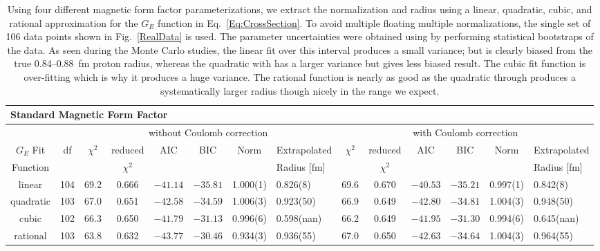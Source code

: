 \documentclass[10pt,aps,prc,twocolumn]{revtex4-1}
\begin{document}
\begin{table}
\caption{Using four different magnetic form factor parameterizations, we extract the normalization
and radius using a linear, quadratic, cubic, and rational approximation for the $G_E$ function in 
Eq.~\ref{Eq:CrossSection}.
To avoid multiple floating multiple normalizations, the single set of 106 data points 
shown in Fig.~\ref{RealData} is used.
The parameter uncertainties were obtained using by performing statistical bootstraps of the data.
As seen during the Monte Carlo studies, the linear fit over this interval produces a small variance; 
but is clearly biased from the true 0.84--0.88~fm proton radius, whereas the quadratic with has a 
larger variance but gives less biased result.   The cubic fit function is over-fitting which is 
why it produces a huge variance.   The rational function is nearly as good as the quadratic through
produces a systematically larger radius though nicely in the range we expect.}
\begin{tabular}{cc|cccccl|cccccl}                                                  \hline \hline
\multicolumn{14}{l}{Standard Magnetic Form Factor}                                 \\ \hline
          &     & \multicolumn{6}{c}{without Coulomb correction}                 & \multicolumn{6}{|c}{with Coulomb correction} \\
$G_E$ Fit & df  & $\chi^2$ & reduced   & AIC    & BIC    & Norm      & Extrapolated& $\chi^2$ & reduced   & AIC    & BIC    & Norm      & Extrapolated    \\  
Function  &     &          & $\chi^2$  &        &        &           & Radius [fm]      &          & $\chi^2$  &        &        &           & Radius [fm]        \\ \hline
linear    & 104 &  69.2    & 0.666     &$-41.14$&$-35.81$& 1.000(1)  & 0.826(8)  &  69.6    & 0.670     &$-40.53$&$-35.21$& 0.997(1)  & 0.842(8)    \\
quadratic & 103 &  67.0    & 0.651     &$-42.58$&$-34.59$& 1.006(3)  & 0.923(50) &  66.9    & 0.649     &$-42.80$&$-34.81$& 1.004(3)  & 0.948(50)   \\
cubic     & 102 &  66.3    & 0.650     &$-41.79$&$-31.13$& 0.996(6)  & 0.598(nan)&  66.2    & 0.649     &$-41.95$&$-31.30$& 0.994(6)  & 0.645(nan)   \\    
rational  & 103 &  63.8    & 0.632     &$-43.77$&$-30.46$& 0.934(3)  & 0.936(55) &  67.0    & 0.650     &$-42.63$&$-34.64$& 1.004(3)  & 0.964(55)   \\ \hline \hline

\end{tabular}
\end{table}
\end{document}
